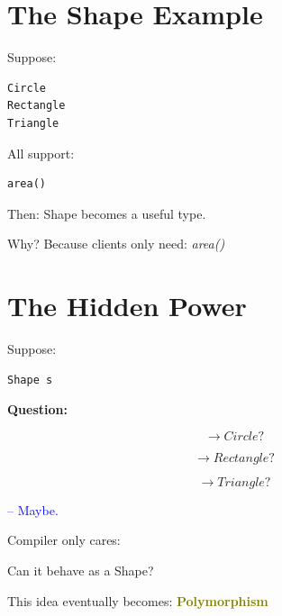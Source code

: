 \documentclass[11pt,a4paper]{book}
\begin{document}
\section{The Shape Example}

Suppose:

\begin{verbatim}
Circle
Rectangle
Triangle
\end{verbatim}


All support:

\begin{verbatim}
area()
\end{verbatim}


Then: \textcolor{RosettaPurple}{Shape} becomes a useful type.


\textcolor{RosettaRedBg}{Why?}
Because clients only need: \emph{\textcolor{RosettaRoyalPurple}{area}\textcolor{RosettaGold}{()}}


\section{The Hidden Power}

Suppose:

\begin{verbatim}
Shape s
\end{verbatim}


\textbf{\textbf{Question:}}

\[\rightarrow Circle?\]

\[\rightarrow Rectangle?\]

\[\rightarrow Triangle?\]


    \textcolor{blue}{-- Maybe.}

Compiler only cares:

    Can it behave as a Shape?


This idea eventually becomes: \textcolor{olive}{\textbf{Polymorphism}}
\end{document}
